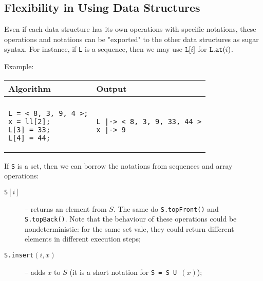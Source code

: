 \documentclass[a4paper]{report}
\begin{document}
\subsection{Flexibility in Using Data Structures}

Even if each data structure has its own operations with specific notations, these operations and notations can be "exported" to the other data structures as sugar syntax. For instance, if \texttt{L} is a sequence, then we may use ${\tt L}[i]$ for ${\tt L.at}(i)$.

Example:
\begin{center}
\begin{tabular}{ll}
Algorithm & Output\\
\hline
\\
\begin{minipage}{.4\textwidth}
\begin{verbatim}
L = < 8, 3, 9, 4 >;
x = ll[2];
L[3] = 33;
L[4] = 44;
\end{verbatim}
\end{minipage}
&
\begin{minipage}{.35\textwidth}
\begin{verbatim}
L |-> < 8, 3, 9, 33, 44 >
x |-> 9
\end{verbatim}
\end{minipage}
\end{tabular}
\end{center}

If {\tt S} is a set, then we can borrow the notations from sequences and array operations:
\begin{description}
\item[{\tt S}{$[i]$}] -- returns an element from $S$. The same do {\tt S.topFront()} and {\tt S.topBack()}. Note that the behaviour of these operations could be nondeterministic: for the same set vale, they could return different elements in different execution steps;
\item[{\tt S.insert}$(i,x)$] -- adds $x$ to $S$ (it is a short notation for {\tt S = S U }$(x)$);
\end{description}
\end{document}
